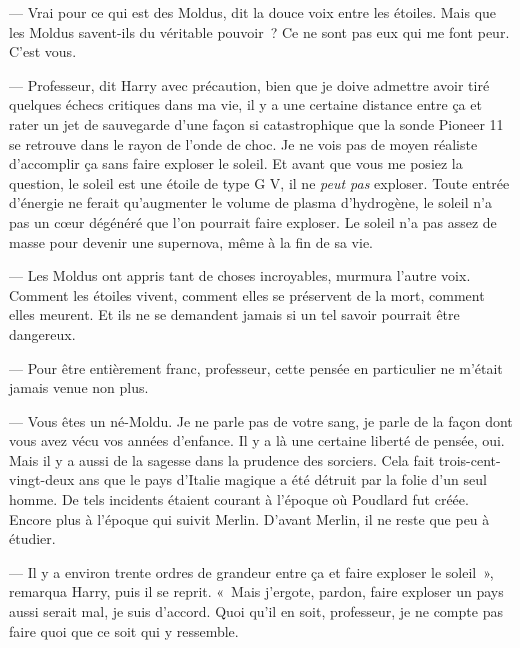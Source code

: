 --- Vrai pour ce qui est des Moldus, dit la douce voix entre les étoiles. Mais que les Moldus savent-ils du véritable pouvoir~? Ce ne sont pas eux qui me font peur. C'est vous.

--- Professeur, dit Harry avec précaution, bien que je doive admettre avoir tiré quelques échecs critiques dans ma vie, il y a une certaine distance entre ça et rater un jet de sauvegarde d'une façon si catastrophique que la sonde Pioneer 11 se retrouve dans le rayon de l'onde de choc. Je ne vois pas de moyen réaliste d'accomplir ça sans faire exploser le soleil. Et avant que vous me posiez la question, le soleil est une étoile de type G V, il ne \emph{peut pas} exploser. Toute entrée d'énergie ne ferait qu'augmenter le volume de plasma d'hydrogène, le soleil n'a pas un cœur dégénéré que l'on pourrait faire exploser. Le soleil n'a pas assez de masse pour devenir une supernova, même à la fin de sa vie.

--- Les Moldus ont appris tant de choses incroyables, murmura l'autre voix. Comment les étoiles vivent, comment elles se préservent de la mort, comment elles meurent. Et ils ne se demandent jamais si un tel savoir pourrait être dangereux.

--- Pour être entièrement franc, professeur, cette pensée en particulier ne m'était jamais venue non plus.

--- Vous êtes un né-Moldu. Je ne parle pas de votre sang, je parle de la façon dont vous avez vécu vos années d'enfance. Il y a là une certaine liberté de pensée, oui. Mais il y a aussi de la sagesse dans la prudence des sorciers. Cela fait trois-cent-vingt-deux ans que le pays d'Italie magique a été détruit par la folie d'un seul homme. De tels incidents étaient courant à l'époque où Poudlard fut créée. Encore plus à l'époque qui suivit Merlin. D'avant Merlin, il ne reste que peu à étudier.

--- Il y a environ trente ordres de grandeur entre ça et faire exploser le soleil~», remarqua Harry, puis il se reprit. «~Mais j'ergote, pardon, faire exploser un pays aussi serait mal, je suis d'accord. Quoi qu'il en soit, professeur, je ne compte pas faire quoi que ce soit qui y ressemble.

